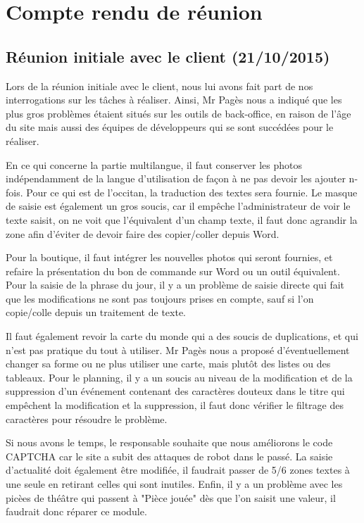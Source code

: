 \documentclass[11pt]{report}
\begin{document}
\section{Compte rendu de réunion}
\subsection{Réunion initiale avec le client (21/10/2015)}
Lors de la réunion initiale avec le client, nous lui avons fait part de nos 
interrogations sur les tâches à réaliser. Ainsi, Mr Pagès nous a indiqué que les
plus gros problèmes étaient situés sur les outils de back-office, en raison de 
l'âge du site mais aussi des équipes de développeurs qui se sont succédées pour
le réaliser. \\
\par En ce qui concerne la partie multilangue, il faut conserver les photos
indépendamment de la langue d'utilisation de façon à ne pas devoir les ajouter
n-fois. Pour ce qui est de l'occitan, la traduction des textes sera fournie.
Le masque de saisie est également un gros soucis, car il empêche
l'administrateur de voir le texte saisit, on ne voit que l'équivalent d'un
champ texte, il faut donc agrandir la zone afin d'éviter de devoir faire des
copier/coller depuis Word. \\
\par Pour la boutique, il faut intégrer les nouvelles photos qui seront
fournies, et refaire la présentation du bon de commande sur Word ou un outil
équivalent. Pour la saisie de la phrase du jour, il y a un problème de saisie
directe qui fait que les modifications ne sont pas toujours prises en compte,
sauf si l'on copie/colle depuis un traitement de texte. \\
\par Il faut également revoir la carte du monde qui a des soucis de
duplications, et qui n'est pas pratique du tout à utiliser. Mr Pagès nous a proposé
d'éventuellement changer sa forme ou ne plus utiliser une carte, mais plutôt
des listes ou des tableaux. Pour le planning, il y a un soucis au niveau de la
modification et de la suppression d'un événement contenant des caractères
douteux dans le titre qui empêchent la modification et la suppression, il faut
donc vérifier le filtrage des caractères pour résoudre le problème. \\
\par Si nous avons le temps, le responsable souhaite que nous améliorons le code
CAPTCHA car le site a subit des attaques de robot dans le passé.
La saisie d'actualité doit également être modifiée, il faudrait passer de 5/6
zones textes à une seule en retirant celles qui sont inutiles.
Enfin, il y a un problème avec les picèes de théâtre qui passent à "Pièce
jouée" dès que l'on saisit une valeur, il faudrait donc réparer ce module.
\end{document}
